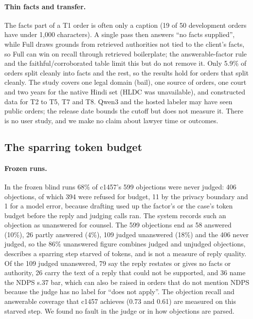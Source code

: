 \paragraph{Thin facts and transfer.} The facts part of a T1 order is often only a caption (19 of 50 development orders have under 1,000 characters). A single pass then answers ``no facts supplied'', while Full draws grounds from retrieved authorities not tied to the client's facts, so Full can win on recall through retrieved boilerplate; the answerable-factor rule and the faithful/corroborated table limit this but do not remove it. Only 5.9\% of orders split cleanly into facts and the rest, so the results hold for orders that split cleanly. The study covers one legal domain (bail), one source of orders, one court and two years for the native Hindi set (HLDC was unavailable), and constructed data for T2 to T5, T7 and T8. Qwen3 and the hosted labeler may have seen public orders; the release date bounds the cutoff but does not measure it. There is no user study, and we make no claim about lawyer time or outcomes.

\subsection{The sparring token budget}

\paragraph{Frozen runs.} In the frozen blind runs 68\% of c1457's 599 objections were never judged: 406 objections, of which 394 were refused for budget, 11 by the privacy boundary and 1 for a model error, because drafting used up the factor's or the case's token budget before the reply and judging calls ran. The system records such an objection as unanswered for counsel. The 599 objections end as 58 answered (10\%), 26 partly answered (4\%), 109 judged unanswered (18\%) and the 406 never judged, so the 86\% unanswered figure combines judged and unjudged objections, describes a sparring step starved of tokens, and is not a measure of reply quality. Of the 109 judged unanswered, 79 say the reply restates or gives no facts or authority, 26 carry the text of a reply that could not be supported, and 36 name the NDPS s.37 bar, which can also be raised in orders that do not mention NDPS because the judge has no label for ``does not apply''. The objection recall and answerable coverage that c1457 achieves (0.73 and 0.61) are measured on this starved step. We found no fault in the judge or in how objections are parsed.

